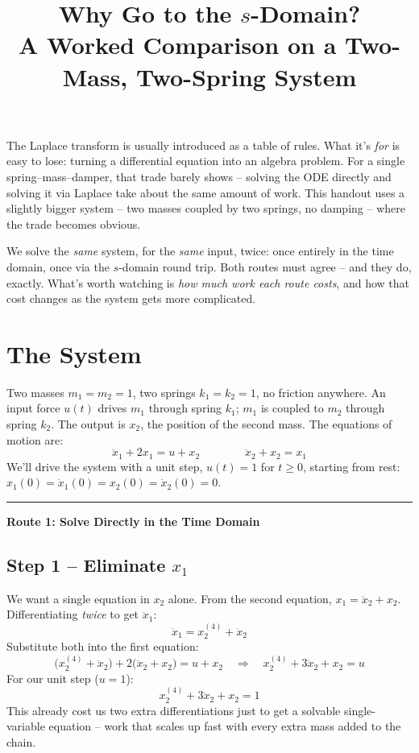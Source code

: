 \documentclass[11pt]{article}
\title{\bfseries Why Go to the $s$-Domain?\\[2pt]\large A Worked Comparison on a Two-Mass, Two-Spring System}
\author{}
\date{}
\newcommand{\tdhead}[1]{{\large\bfseries\color{tdcolor} #1}}
\begin{document}
\maketitle
\vspace{-1.5em}

The Laplace transform is usually introduced as a table of rules. What it's
\emph{for} is easy to lose: turning a differential equation into an algebra
problem. For a single spring--mass--damper, that trade barely shows --
solving the ODE directly and solving it via Laplace take about the same
amount of work. This handout uses a slightly bigger system -- two masses
coupled by two springs, no damping -- where the trade becomes obvious.

We solve the \emph{same} system, for the \emph{same} input, twice: once
entirely in the time domain, once via the $s$-domain round trip. Both
routes must agree -- and they do, exactly. What's worth watching is
\emph{how much work each route costs}, and how that cost changes as the
system gets more complicated.

\section*{The System}

Two masses $m_1=m_2=1$, two springs $k_1=k_2=1$, no friction anywhere. An
input force $u(t)$ drives $m_1$ through spring $k_1$; $m_1$ is coupled to
$m_2$ through spring $k_2$. The output is $x_2$, the position of the
second mass. The equations of motion are:
\[
\ddot x_1 + 2x_1 = u + x_2
\qquad\qquad
\ddot x_2 + x_2 = x_1
\]
We'll drive the system with a unit step, $u(t)=1$ for $t\ge 0$, starting
from rest: $x_1(0)=\dot x_1(0)=x_2(0)=\dot x_2(0)=0$.

\bigskip
\hrule
\bigskip

\tdhead{Route 1: Solve Directly in the Time Domain}

\subsection*{Step 1 -- Eliminate $x_1$}

We want a single equation in $x_2$ alone. From the second equation,
$x_1 = \ddot x_2 + x_2$. Differentiating \emph{twice} to get $\ddot x_1$:
\[
\ddot x_1 = x_2^{(4)} + \ddot x_2
\]
Substitute both into the first equation:
\[
\big(x_2^{(4)}+\ddot x_2\big) + 2\big(\ddot x_2 + x_2\big) = u + x_2
\quad\Longrightarrow\quad
x_2^{(4)} + 3\ddot x_2 + x_2 = u
\]
For our unit step ($u=1$):
\[
x_2^{(4)} + 3\ddot x_2 + x_2 = 1
\]
This already cost us two extra differentiations just to get a solvable
single-variable equation -- work that scales up fast with every extra
mass added to the chain.
\end{document}
